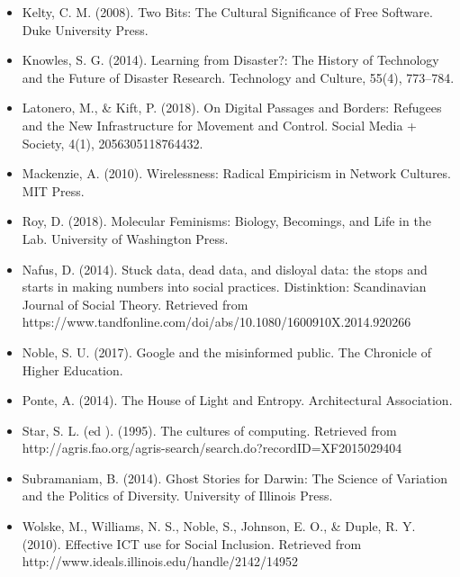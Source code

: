 \documentclass[a4paper,man,natbib]{apa6}
\begin{document}
\begin{itemize}[label={},itemindent=-2em,leftmargin=2em]
   \item Kelty, C. M. (2008). Two Bits: The Cultural Significance of Free Software. Duke University Press.

   \item Knowles, S. G. (2014). Learning from Disaster?: The History of Technology and the Future of Disaster Research. Technology and Culture, 55(4), 773–784.

   \item Latonero, M., \& Kift, P. (2018). On Digital Passages and Borders: Refugees and the New Infrastructure for Movement and Control. Social Media + Society, 4(1), 2056305118764432.

   \item Mackenzie, A. (2010). Wirelessness: Radical Empiricism in Network Cultures. MIT Press.

   \item Roy, D. (2018). Molecular Feminisms: Biology, Becomings, and Life in the Lab. University of Washington Press.

   \item Nafus, D. (2014). Stuck data, dead data, and disloyal data: the stops and starts in making numbers into social practices. Distinktion: Scandinavian Journal of Social Theory. Retrieved from https://www.tandfonline.com/doi/abs/10.1080/1600910X.2014.920266

   \item Noble, S. U. (2017). Google and the misinformed public. The Chronicle of Higher Education.

   \item Ponte, A. (2014). The House of Light and Entropy. Architectural Association.

   \item Star, S. L. (ed ). (1995). The cultures of computing. Retrieved from http://agris.fao.org/agris-search/search.do?recordID=XF2015029404

   \item Subramaniam, B. (2014). Ghost Stories for Darwin: The Science of Variation and the Politics of Diversity. University of Illinois Press.

   \item Wolske, M., Williams, N. S., Noble, S., Johnson, E. O., \& Duple, R. Y. (2010). Effective ICT use for Social Inclusion. Retrieved from http://www.ideals.illinois.edu/handle/2142/14952

   \end{itemize}

   \setlength{\parindent}{4em}
   
\end{document}
